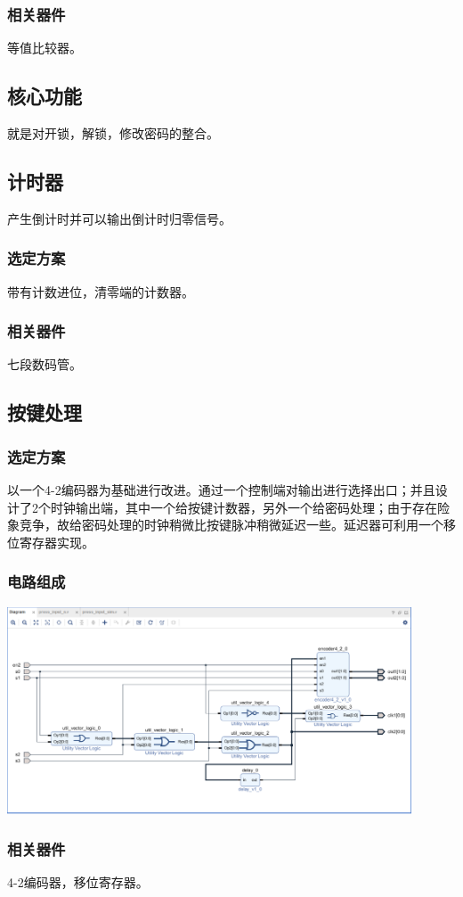 \documentclass[a4paper,11pt]{ctexart}
\begin{document}
\subsubsection{相关器件}等值比较器。

\subsection{核心功能}就是对开锁，解锁，修改密码的整合。
\subsection{计时器}产生倒计时并可以输出倒计时归零信号。
\subsubsection{选定方案}带有计数进位，清零端的计数器。
\subsubsection{相关器件}七段数码管。

\subsection{按键处理}
\subsubsection{选定方案}以一个4-2编码器为基础进行改进。通过一个控制端对输出进行选择出口；并且设计了2个时钟输出端，其中一个给按键计数器，另外一个给密码处理；由于存在险象竞争，故给密码处理的时钟稍微比按键脉冲稍微延迟一些。延迟器可利用一个移位寄存器实现。
\subsubsection{电路组成}\includegraphics[width =0.9\textwidth]{./images/pic4.eps}
\subsubsection{相关器件}4-2编码器，移位寄存器。
\end{document}

